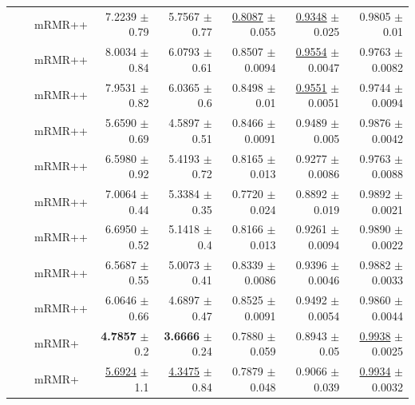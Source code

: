 \begin{longtable}{llp{}rrrrr}
 &  & mRMR++ & 7.2239 {\scriptsize $\pm$ 0.79} & 5.7567 {\scriptsize $\pm$ 0.77} & \underline{0.8087} {\scriptsize $\pm$ 0.055} & \underline{0.9348} {\scriptsize $\pm$ 0.025} & 0.9805 {\scriptsize $\pm$ 0.01} \\
 &  & mRMR++ & 8.0034 {\scriptsize $\pm$ 0.84} & 6.0793 {\scriptsize $\pm$ 0.61} & 0.8507 {\scriptsize $\pm$ 0.0094} & \underline{0.9554} {\scriptsize $\pm$ 0.0047} & 0.9763 {\scriptsize $\pm$ 0.0082} \\
 &  & mRMR++ & 7.9531 {\scriptsize $\pm$ 0.82} & 6.0365 {\scriptsize $\pm$ 0.6} & 0.8498 {\scriptsize $\pm$ 0.01} & \underline{0.9551} {\scriptsize $\pm$ 0.0051} & 0.9744 {\scriptsize $\pm$ 0.0094} \\
 &  & mRMR++ & 5.6590 {\scriptsize $\pm$ 0.69} & 4.5897 {\scriptsize $\pm$ 0.51} & 0.8466 {\scriptsize $\pm$ 0.0091} & 0.9489 {\scriptsize $\pm$ 0.005} & 0.9876 {\scriptsize $\pm$ 0.0042} \\
 &  & mRMR++ & 6.5980 {\scriptsize $\pm$ 0.92} & 5.4193 {\scriptsize $\pm$ 0.72} & 0.8165 {\scriptsize $\pm$ 0.013} & 0.9277 {\scriptsize $\pm$ 0.0086} & 0.9763 {\scriptsize $\pm$ 0.0088} \\
 &  & mRMR++ & 7.0064 {\scriptsize $\pm$ 0.44} & 5.3384 {\scriptsize $\pm$ 0.35} & 0.7720 {\scriptsize $\pm$ 0.024} & 0.8892 {\scriptsize $\pm$ 0.019} & 0.9892 {\scriptsize $\pm$ 0.0021} \\
 &  & mRMR++ & 6.6950 {\scriptsize $\pm$ 0.52} & 5.1418 {\scriptsize $\pm$ 0.4} & 0.8166 {\scriptsize $\pm$ 0.013} & 0.9261 {\scriptsize $\pm$ 0.0094} & 0.9890 {\scriptsize $\pm$ 0.0022} \\
 &  & mRMR++ & 6.5687 {\scriptsize $\pm$ 0.55} & 5.0073 {\scriptsize $\pm$ 0.41} & 0.8339 {\scriptsize $\pm$ 0.0086} & 0.9396 {\scriptsize $\pm$ 0.0046} & 0.9882 {\scriptsize $\pm$ 0.0033} \\
 &  & mRMR++ & 6.0646 {\scriptsize $\pm$ 0.66} & 4.6897 {\scriptsize $\pm$ 0.47} & 0.8525 {\scriptsize $\pm$ 0.0091} & 0.9492 {\scriptsize $\pm$ 0.0054} & 0.9860 {\scriptsize $\pm$ 0.0044} \\
 &  & mRMR+ & \textbf{4.7857} {\scriptsize $\pm$ 0.2} & \textbf{3.6666} {\scriptsize $\pm$ 0.24} & 0.7880 {\scriptsize $\pm$ 0.059} & 0.8943 {\scriptsize $\pm$ 0.05} & \underline{0.9938} {\scriptsize $\pm$ 0.0025} \\
 &  & mRMR+ & \underline{5.6924} {\scriptsize $\pm$ 1.1} & \underline{4.3475} {\scriptsize $\pm$ 0.84} & 0.7879 {\scriptsize $\pm$ 0.048} & 0.9066 {\scriptsize $\pm$ 0.039} & \underline{0.9934} {\scriptsize $\pm$ 0.0032} \\

\end{longtable}
